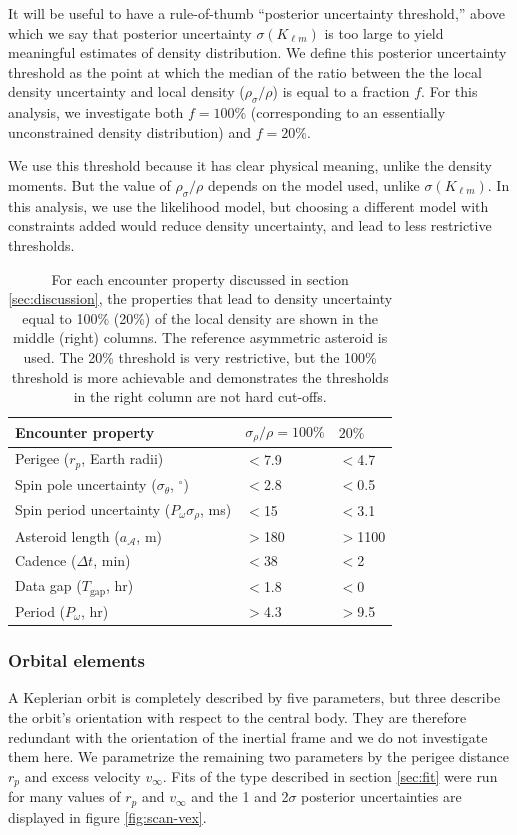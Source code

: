 \documentclass[fleqn,usenatbib]{mnras}
\begin{document}
It will be useful to have a rule-of-thumb ``posterior uncertainty threshold,'' above which we say that posterior uncertainty $\sigma(K_{\ell m})$ is too large to yield meaningful estimates of density distribution. We define this posterior uncertainty threshold as the point at which the median of the ratio between the the local density uncertainty and local density  ($\rho_\sigma / \rho$) is equal to a fraction $f$. For this analysis, we investigate both $f=100\%$ (corresponding to an essentially unconstrained density distribution) and $f=20\%$.

We use this threshold because it has clear physical meaning, unlike the density moments. But the value of $\rho_\sigma / \rho$ depends on the model used, unlike $\sigma(K_{\ell m})$. In this analysis, we use the likelihood model, but choosing a different model with constraints added would reduce density uncertainty, and lead to less restrictive thresholds.

\begin{table}
  \centering
  \begin{tabular}{lll} \hline
    Encounter property & $\sigma_\rho / \rho = 100\%$ & $20\%$ \\ \hline
    Perigee ($r_p$, Earth radii) & $<$7.9 & $<$4.7 \\
    Spin pole uncertainty ($\sigma_\theta$, $^\circ$) & $<$2.8 & $<$0.5 \\
    Spin period uncertainty ($P_\omega \sigma_\rho$, ms) & $<$15 & $<$3.1\\
    Asteroid length ($a_\mathcal{A}$, m) & $>$180 & $>$1100 \\
    Cadence ($\Delta t$, min) & $<$38 & $<$2 \\
    Data gap ($T_\text{gap}$, hr) & $<$1.8 & $<$0 \\
    Period ($P_\omega$, hr) & $>$4.3 & $>$9.5\\ \hline
  \end{tabular}
  \caption{For each encounter property discussed in section \ref{sec:discussion}, the properties that lead to density uncertainty equal to 100\% (20\%) of the local density are shown in the middle (right) columns. The reference asymmetric asteroid is used. The 20\% threshold is very restrictive, but the 100\% threshold is more achievable and demonstrates the thresholds in the right column are not hard cut-offs.}
  \label{tab:threshold-summary}
\end{table}


\subsubsection{Orbital elements}
\label{sec:scan-orbit}
A Keplerian orbit is completely described by five parameters, but three describe the orbit's orientation with respect to the central body. They are therefore redundant with the orientation of the inertial frame and we do not investigate them here. We parametrize the remaining two parameters by the perigee distance $r_p$ and excess velocity $v_\infty$. Fits of the type described in section \ref{sec:fit} were run for many values of $r_p$ and $v_\infty$ and the 1 and 2$\sigma$ posterior uncertainties are displayed in figure \ref{fig:scan-vex}.
\end{document}

